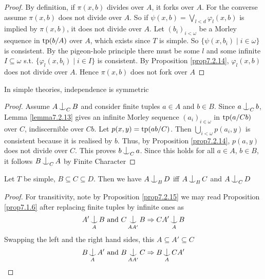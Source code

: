 \documentclass[11pt]{article}
\begin{document}
\begin{proof}
By definition, if \(\pi(x,b)\) divides over \(A\), it forks over \(A\). For the converse
assume \(\pi(x,b)\) does not divide over \(A\). So if \(\psi(x,b)=\bigvee_{l<d}\varphi_l(x,b)\) is implied
by \(\pi(x,b)\), it does not divide over \(A\). Let \((b_i)_{i<\omega}\) be a Morley sequence
in \(\operatorname{tp}(b/A)\) over \(A\), which exists since \(T\) is simple. So \(\{\psi(x,b_i)\mid i\in\omega\}\) is
consistent. By the pigeon-hole principle there must be some \(l\) and some infinite \(I\subseteq\omega\)
s.t. \(\{\varphi_l(x,b_i)\mid i\in I\}\) is consistent. By Proposition \ref{prop7.2.14}, \(\varphi_l(x,b)\) does not
divide over \(A\). Hence \(\pi(x,b)\) does not fork over \(A\)
\end{proof}

\begin{proposition}[Symmetry]
\label{prop7.2.16}
In simple theories, independence is symmetric
\end{proposition}

\begin{proof}
Assume \(A\ind_CB\) and consider finite tuples \(a\in A\) and \(b\in B\). Since \(a\ind_Cb\), Lemma
\ref{lemma7.2.13} gives an infinite Morley sequence \((a_i)_{i\in\omega}\) in \(\operatorname{tp}(a/Cb)\) over \(C\),
indiscernible over \(Cb\). Let \(p(x,y)=\operatorname{tp}(ab/C)\). Then \(\bigcup_{i<\omega}p(a_i,y)\) is consistent
because it is realised by \(b\). Thus, by Proposition \ref{prop7.2.14}, \(p(a,y)\) does not divide
over \(C\). This proves \(b\ind_Ca\). Since this holds for all \(a\in A\), \(b\in B\), it
follows \(B\ind_CA\) by Finite Character
\end{proof}

\begin{corollary}
Let \(T\) be simple, \(B\subseteq C\subseteq D\). Then we have \(A\ind_BD\) iff \(A\ind_BC\) and \(A\ind_CD\)
\end{corollary}

\begin{proof}
For transitivity, note by Proposition \ref{prop7.2.15} we may read Proposition \ref{prop7.1.6} after
replacing finite tuples by infinite ones as
\begin{equation*}
A'\ind_AB\text{ and }C\ind_{AA'}B\Rightarrow CA'\ind_AB
\end{equation*}
Swapping the left and the right hand sides, this
\(A\subseteq A'\subseteq C\)
\begin{equation*}
B\ind_AA'\text{ and }B\ind_{AA'}C\Rightarrow B\ind_ACA'
\end{equation*}
\end{proof}
\end{document}
